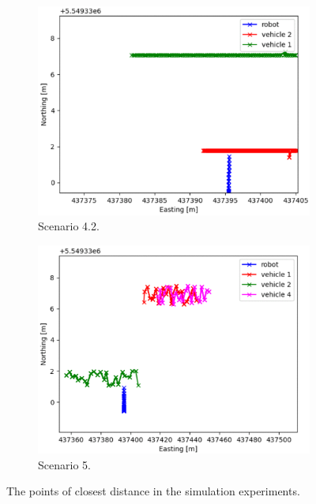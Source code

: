 \begin{figure}[H]
\begin{subfigure}{0.49\linewidth}
                \includegraphics[width=\linewidth]{images/simulations/closest_4_2.png}
                \caption{Scenario 4.2.}
            \end{subfigure}
            \begin{subfigure}{0.49\linewidth}
                \centering
                \includegraphics[width=\linewidth]{images/simulations/closest_5.png}
                \caption{Scenario 5.}
            \end{subfigure}
            \caption{The points of closest distance in the simulation experiments.}
            \label{fig:closest}
        \end{figure}
